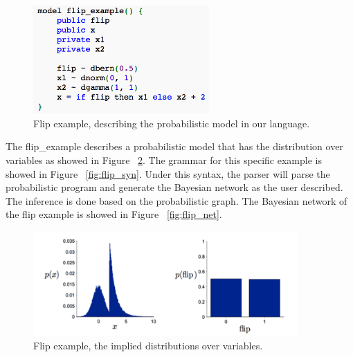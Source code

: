 \begin{figure}
    \centering
    \includegraphics[width=0.6\textwidth]{figures/flip_eg.png}
    \caption{Flip example, describing the probabilistic model in our language.}
    \label{fig:flip_eg}
\end{figure}

The flip\_example describes a probabilistic model that has the distribution over variables as showed in Figure ~\ref{fig:flip_dist}. The grammar for this specific example is showed in Figure ~\ref{fig:flip_syn}. Under this syntax, the parser will parse the probabilistic program and generate the Bayesian network as the user described. The inference is done based on the probabilistic graph. The Bayesian network of the flip example is showed in Figure ~\ref{fig:flip_net}.


\begin{figure}
    \centering
    \includegraphics[width=0.9\textwidth]{figures/flip_dist.png}
    \caption{Flip example, the implied distributions over variables.}
    \label{fig:flip_dist}
\end{figure}


